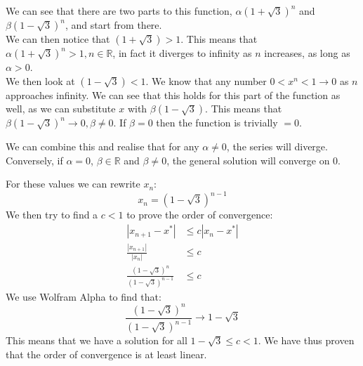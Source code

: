 We can see that there are two parts to this function, $\alpha(1+\sqrt{3})^n$ and $\beta(1-\sqrt{3})^n$, and start from there. \\
We can then notice that $(1+\sqrt{3}) > 1$. This means that $\alpha(1+\sqrt{3})^n > 1, n \in \mathbb{R}$, in fact it diverges to infinity as $n$ increases, as long as $\alpha > 0$. \\
We then look at $(1-\sqrt{3}) < 1$. We know that any number $0 < x^n < 1 \rightarrow 0$ as $n$ approaches infinity. We can see that this holds for this part of the function as well, as we can substitute $x$ with $\beta(1-\sqrt3)$. This means that $\beta(1-\sqrt3)^n \rightarrow 0, \beta \neq 0$. If $\beta = 0$ then the function is trivially $=0$.

We can combine this and realise that for any $\alpha \neq 0$, the series will diverge. Conversely, if $\alpha = 0$, $\beta \in \mathbb{R}$ and $\beta \neq 0$, the general solution will converge on $0$.

For these values we can rewrite $x_n$:
$$
x_n = (1-\sqrt3)^{n-1}
$$
We then try to find a $c < 1$ to prove the order of convergence:
\begin{align*}
  |x_{n+1}-x^*| &\leq c|x_n - x^*| \\
  \frac{|x_{n+1}|}{|x_n|} &\leq c \\
  \frac{(1-\sqrt3)^n}{(1-\sqrt3)^{n-1}} &\leq c
\end{align*}
We use Wolfram Alpha to find that:
$$
\frac{(1-\sqrt3)^n}{(1-\sqrt3)^{n-1}} \rightarrow 1 - \sqrt3
$$
This means that we have a solution for all $1 - \sqrt3 \leq c < 1$.
We have thus proven that the order of convergence is at least linear.
